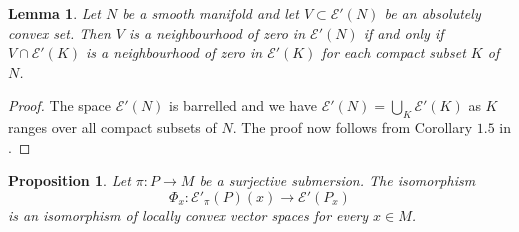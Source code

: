 \documentclass[a4paper]{amsart}
\newtheorem{prop}[dfn]{Proposition}
\newtheorem{lem}[dfn]{Lemma}
\newcommand{\cE}{\mathcal{E}}
\begin{document}
\begin{lem}\label{Limit structure on compactly supported distributions}
Let $N$ be a smooth manifold and let $V\subset\cE'(N)$ be an absolutely convex set. Then $V$ is a neighbourhood of zero in $\cE'(N)$
if and only if $V\cap\cE'(K)$ is a neighbourhood of zero in $\cE'(K)$ for each compact subset $K$ of $N$. 
\end{lem}
\begin{proof}
The space $\cE'(N)$ is barrelled and we have $\cE'(N)=\bigcup_{K}\cE'(K)$ as $K$ ranges over all compact subsets of $N$.
The proof now follows from Corollary $1.5$ in \cite{Val71}.
\end{proof}

\begin{prop}
Let $\pi:P\to M$ be a surjective submersion. The isomorphism
\[
\Phi_{x}:\cE'_{\pi}(P)(x)\to\cE'(P_{x})
\]
is an isomorphism of locally convex vector spaces for every $x\in M$.
\end{prop}
\end{document}
